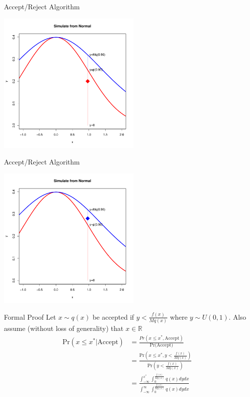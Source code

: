 \documentclass
[handout]
{beamer}
\begin{document}
\begin{frame}{Accept/Reject Algorithm}
\begin{center}
\includegraphics[height=7cm]{./Pics/nmlg6.pdf}
\end{center}
\end{frame}
\begin{frame}{Accept/Reject Algorithm}
\begin{center}
\includegraphics[height=7cm]{./Pics/nmlg7.pdf}
\end{center}
\end{frame}
\begin{frame}{Formal Proof}
Let $x\sim q(x)$ be accepted if $y<\frac{f(x)}{Mq(x)}$ where $y\sim U(0,1)$.  Also assume (without loss of generality) that $x\in\mathbb{R}$ 
\begin{align*}
\mbox{Pr}(x\leq x^*|\mbox{Accept})&=\frac{Pr\left(x\leq x^*,\mbox{Accept}\right)}{\mbox{Pr(Accept)}}\\
&=\frac{\mbox{Pr}\left(x\leq x^*,y<\frac{f(x)}{Mq(x)}
\right)}{\mbox{Pr}\left(y<\frac{f(x)}{Mq(x)}\right)}\\
&=\frac{\int_{-\infty}^{x^*}\int_{0}^{\frac{f(x)}{Mq(x)}}q(x)dydx}{\int_{-\infty}^{\infty}\int_{0}^{\frac{f(x)}{Mq(x)}}q(x)dydx}
\end{align*}
\end{frame}
\end{document}

